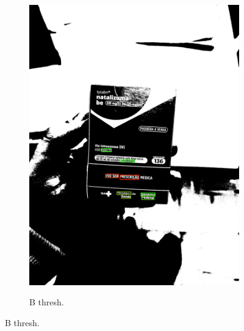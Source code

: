 \begin{figure}[htb]
\begin{subfigure}[t]{0.21\textwidth}
        \includegraphics[width=\linewidth]{../pictures/tysabri_rgb_g_only_thresh_boxes.jpg}
    \end{subfigure}
    \hfill
    \begin{subfigure}[t]{0.21\textwidth}
        \centering
        \caption{B thresh.}
        \label{fig:foto:versoes:1:B_thresh:boxes}

\end{subfigure}
\end{figure}

